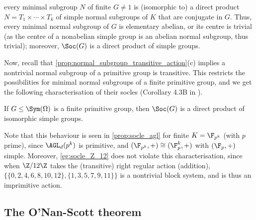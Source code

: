  every minimal subgroup $N$ of finite $G \neq 1$ is (isomorphic to) a direct product $N = T_1 \times \dotsb \times T_k$ of simple normal subgroups of $K$ that are conjugate in $G$. Thus, every minimal normal subgroup of $G$ is elementary abelian, or its centre is trivial (as the centre of a nonabelian simple group is an abelian normal subgroup, thus trivial); moreover, $\Soc(G)$ is a direct product of simple groups.

Now, recall that \autoref{prop:normal_subgroup_transitive_action}(c) implies a nontrivial normal subgroup of a primitive group is transitive. This restricts the possibilities for minimal normal subgroups of a finite primitive group, and we get the following characterisation of their socles (Corollary 4.3B in \cite{dixon_mortimer_perm_groups1996}).

\begin{theorem}\label{thm:socle_is_direct_product}
    If $G \leq \Sym(\Omega)$ is a finite primitive group, then $\Soc(G)$ is a direct product of isomorphic simple groups.
\end{theorem}

Note that this behaviour is seen in \autoref{prop:socle_agl} for finite $K = \F_{p^k}$ (with $p$ prime), since $\AGL_d(p^k)$ is primitive, and $(\F_{p^k},+) \cong (\F_p^k,+)$ with $(\F_p,+)$ simple. Moreover, \autoref{eg:socle_Z_12} does not violate this characterisation, since when $\Z/12\Z$ takes the (transitive) right regular action (addition), $\{\{0,2,4,6,8,10,12\},\{1,3,5,7,9,11\}\}$ is a nontrivial block system, and is thus an imprimitive action.

\subsection{The O'Nan-Scott theorem}

